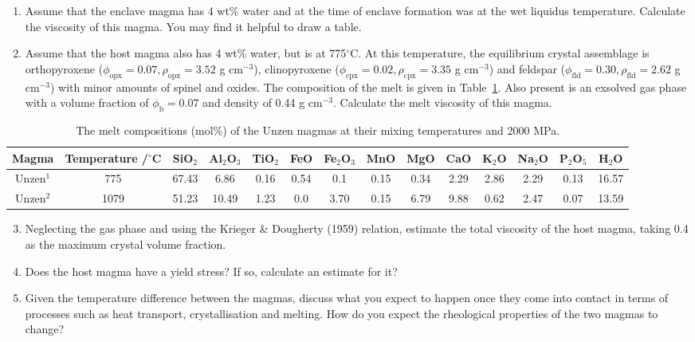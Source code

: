 \documentclass[]{book}
\theoremstyle{definition}
\begin{document}
\begin{enumerate}
  \begin{enumerate}
    \setcounter{enumii}{0}
  \item Assume that the enclave magma has 4 wt\% water and at the time of enclave formation was at the wet liquidus temperature. Calculate the viscosity of this magma. You may find it helpful to draw a table.
  \item Assume that the host magma also has 4 wt\% water, but is at 775$ ^{\circ}$C. At this temperature, the equilibrium crystal assemblage is orthopyroxene ($\phi_{\text{opx}} = 0.07, \rho_{\text{opx}} = 3.52$ g cm$^{-3}$), clinopyroxene ($\phi_{\text{cpx}} = 0.02, \rho_{\text{cpx}} = 3.35$ g cm$^{-3}$) and feldspar ($\phi_{\text{fld}} = 0.30, \rho_{\text{fld}} = 2.62$ g cm$^{-3}$) with minor amounts of spinel and oxides. The composition of the melt is given in Table~\ref{tab:cold_comp}. Also present is an exsolved gas phase with a volume fraction of $\phi_{\text{b}} = 0.07$ and density of 0.44 g cm$^{-3}$. Calculate the melt viscosity of this magma. 
  \end{enumerate}

  \begin{table}
    \small
    \centering
    \caption{The melt compositions (mol\%) of the Unzen magmas at their mixing temperatures and 2000 MPa. \label{tab:cold_comp}}
    \begin{tabular}{|c c|c c c c c c c c c c c c|}
      \hline
      Magma  & Temperature /$^{\circ}$C & SiO$_{2}$ & Al$_{2}$O$_{3}$ & TiO$_{2}$ & FeO & Fe$_{2}$O$_{3}$ & MnO & MgO & CaO & K$_{2}$O & Na$_{2}$O & P$_{2}$O$_{5}$ & H$_{2}$O \\
      \hline
      Unzen$^{1}$ & 775 & 67.43 & 6.86 & 0.16 & 0.54 & 0.1 & 0.15 & 0.34 & 2.29 & 2.86 & 2.29 & 0.13 & 16.57 \\
      Unzen$^{2}$ & 1079 & 51.23 & 10.49 & 1.23 & 0.0 & 3.70 & 0.15 & 6.79 & 9.88 & 0.62 & 2.47 & 0.07 & 13.59 \\
      \hline
    \end{tabular}
  \end{table}

  \begin{enumerate}
    \setcounter{enumii}{2}
  \item Neglecting the gas phase and using the Krieger \& Dougherty (1959) relation, estimate the total viscosity of the host magma, taking 0.4 as the maximum crystal volume fraction. \\
  \item Does the host magma have a yield stress? If so, calculate an estimate for it? \\
  \item Given the temperature difference between the magmas, discuss what you expect to happen once they come into contact in terms of processes such as heat transport, crystallisation and melting. How do you expect the rheological properties of the two magmas to change?
  \end{enumerate}


\end{enumerate}
\end{document}
